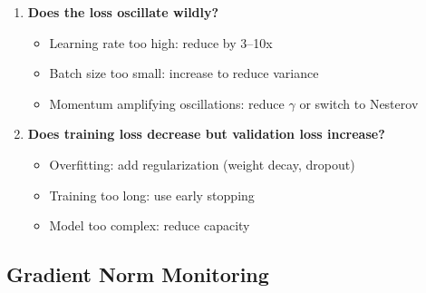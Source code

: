 \documentclass[../../main.tex]{subfiles}
\begin{document}
\begin{principle}
\begin{enumerate}
    \item \textbf{Does the loss oscillate wildly?}
    \begin{itemize}
        \item Learning rate too high: reduce by 3--10x
        \item Batch size too small: increase to reduce variance
        \item Momentum amplifying oscillations: reduce $\gamma$ or switch to Nesterov
    \end{itemize}

    \item \textbf{Does training loss decrease but validation loss increase?}
    \begin{itemize}
        \item Overfitting: add regularization (weight decay, dropout)
        \item Training too long: use early stopping
        \item Model too complex: reduce capacity
    \end{itemize}
\end{enumerate}
\end{principle}

\subsection{Gradient Norm Monitoring}
\end{document}
